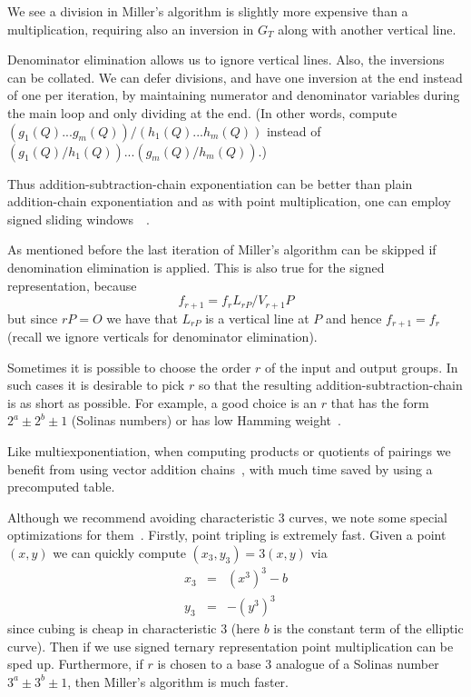 We see a division in Miller's algorithm is slightly more expensive than
a multiplication, requiring also an inversion in $G_T$ along with
another vertical line.

Denominator elimination allows us to ignore vertical lines. Also, the
inversions can be collated. We can defer divisions, and have one inversion at
the end instead of one per iteration, by maintaining numerator and denominator
variables during the main loop and only dividing at the end. (In other words,
compute $(g_1(Q) ... g_m(Q)) / (h_1(Q) ... h_m(Q))$ instead of $(g_1(Q) /
h_1(Q)) ... (g_m(Q) / h_m(Q))$.)

Thus addition-subtraction-chain exponentiation can be
better than plain addition-chain exponentiation and as with
point multiplication, one can employ signed sliding
windows~\cite[Chapter 14]{handbook}~\cite[Section IV.2.5]{bss}.

As mentioned before the last iteration of Miller's algorithm can be skipped
if denomination elimination is applied.
This is also true for the signed representation, because
\[
f_{r+1} = f_r L_{rP} / V_{r+1}P
\]
but since $rP = O$
we have that $L_{rP}$ is a vertical line at $P$ and hence $f_{r+1} = f_r$
(recall we ignore verticals for denominator elimination).

Sometimes it is possible to choose the order $r$ of the input and output
groups. In such cases it is desirable to pick $r$ so that the resulting
addition-subtraction-chain is as short as possible. For example, a good choice
is an $r$ that has the form $2^a \pm 2^b \pm 1$ (Solinas numbers) or has low
Hamming weight~\cite{bakls}.

Like multiexponentiation, when computing products or quotients of pairings we
benefit from using vector addition chains~\cite[Chapter 14]{handbook}, with
much time saved by using a precomputed table.

Although we recommend avoiding characteristic 3 curves, we note some special
optimizations for them~\cite{bakls}. Firstly, point tripling is extremely fast.
Given a point $(x,y)$ we can quickly compute $(x_3,y_3) = 3(x,y)$ via
\[
\begin{array}{lcl}
x_3 &=& (x^3)^3 - b \\
y_3 &=& -(y^3)^3
\end{array}
\]
since cubing is cheap in characteristic 3
(here $b$ is the constant term of the elliptic curve).
Then if we use signed ternary representation point multiplication can be
sped up. Furthermore, if $r$ is chosen to
a base 3 analogue of a Solinas number $3^a \pm 3^b \pm 1$,
then Miller's algorithm is much faster.

